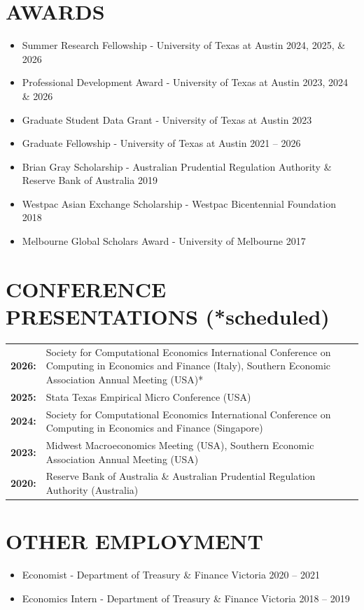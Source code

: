 \documentclass[letterpaper,11pt]{article}
\begin{document}
\section{\textbf{AWARDS}}
\begin{itemize}
  \item Summer Research Fellowship - University of Texas at Austin \hfill 2024, 2025, \& 2026
  \item Professional Development Award - University of Texas at Austin \hfill 2023, 2024 \& 2026
  \item Graduate Student Data Grant - University of Texas at Austin \hfill 2023
  \item Graduate Fellowship - University of Texas at Austin \hfill 2021 -- 2026
  \item Brian Gray Scholarship - Australian Prudential Regulation Authority \& Reserve Bank of Australia \hfill 2019
  \item Westpac Asian Exchange Scholarship - Westpac Bicentennial Foundation \hfill 2018
  \item Melbourne Global Scholars Award - University of Melbourne \hfill 2017
\end{itemize}

\section{\textbf{CONFERENCE PRESENTATIONS} (*scheduled)}
\noindent
\begin{tabular}{@{}p{} p{}@{}}
\textbf{2026:} & Society for Computational Economics International Conference on Computing 
    in Economics and Finance (Italy), Southern Economic Association Annual Meeting (USA)*\\[0.8em]
\textbf{2025:} & Stata Texas Empirical Micro Conference (USA)\\[0.8em]
\textbf{2024:} & Society for Computational Economics International Conference on Computing in Economics and Finance (Singapore)\\[0.8em]
\textbf{2023:} & Midwest Macroeconomics Meeting (USA), Southern Economic Association Annual Meeting (USA)\\[0.8em]
\textbf{2020:} & Reserve Bank of Australia \& Australian Prudential Regulation Authority (Australia)\\
\end{tabular}

\section{\textbf{OTHER EMPLOYMENT}}
\begin{itemize}
  \item Economist - Department of Treasury \& Finance Victoria \hfill 2020 -- 2021
  \item Economics Intern - Department of Treasury \& Finance Victoria \hfill 2018 -- 2019
\end{itemize}
\end{document}
